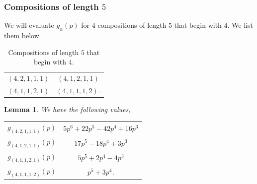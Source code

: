 \documentclass[a4paper]{amsart}
\newtheorem{lemma}[theorem]{Lemma}
\numberwithin{equation}{section}
\theoremstyle{remark}
\begin{document}
\subsubsection{Compositions of length $5$}We will evaluate $g_{\alpha}(p)$ for $4$ compositions of length $5$ that begin with $4$. We list them below\\
\begin{table}[H]
\centering
\begin{tabular}{c c } 
\hline
$(4,2,1,1,1)$ & $(4,1,2,1,1)$\\ 
$(4,1,1,2,1)$ & $(4,1,1,1,2)$.\\
\hline
\end{tabular}
\caption{Compositions of length $5$ that begin with $4$.}
\end{table}
\begin{lemma}
We have the following values,
\begin{table}[H]
\centering
 \begin{tabular}{c c } 
 \hline
 $g_{(4,2,1,1,1)}(p)$ & $5p^6+22p^5-42p^4+16p^3$\\ 
 $g_{(4,1,2,1,1)}(p)$ & $17p^5-18p^4+3p^3$\\
 $g_{(4,1,1,2,1)}(p)$ & $5p^5+2p^4-4p^3$\\
 $g_{(4,1,1,1,2)}(p)$ & $p^5+3p^4$.\\
\hline
\end{tabular}
\end{table}
\end{lemma}
\end{document}
